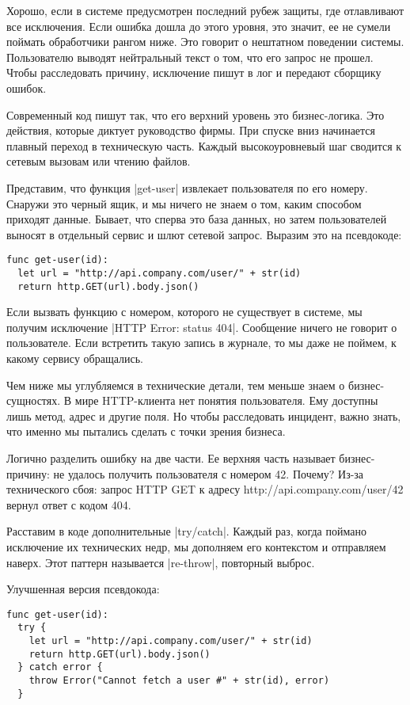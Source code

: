 Хорошо, если в системе предусмотрен последний рубеж защиты, где отлавливают все
исключения. Если ошибка дошла до этого уровня, это значит, ее не сумели поймать
обработчики рангом ниже. Это говорит о нештатном поведении системы. Пользователю
выводят нейтральный текст о том, что его запрос не прошел. Чтобы расследовать
причину, исключение пишут в лог и передают сборщику ошибок.

Современный код пишут так, что его верхний уровень это бизнес-логика. Это
действия, которые диктует руководство фирмы. При спуске вниз начинается плавный
переход в техническую часть. Каждый высокоуровневый шаг сводится к сетевым
вызовам или чтению файлов.

Представим, что функция \spverb|get-user| извлекает пользователя по его номеру. Снаружи
это черный ящик, и мы ничего не знаем о том, каким способом приходят
данные. Бывает, что сперва это база данных, но затем пользователей выносят в
отдельный сервис и шлют сетевой запрос. Выразим это на псевдокоде:

\begin{verbatim}
func get-user(id):
  let url = "http://api.company.com/user/" + str(id)
  return http.GET(url).body.json()
\end{verbatim}

Если вызвать функцию с номером, которого не существует в системе, мы получим
исключение \spverb|HTTP Error: status 404|. Сообщение ничего не говорит о
пользователе. Если встретить такую запись в журнале, то мы даже не поймем, к
какому сервису обращались.

Чем ниже мы углубляемся в технические детали, тем меньше знаем о
бизнес-сущностях. В мире HTTP-клиента нет понятия пользователя. Ему доступны
лишь метод, адрес и другие поля. Но чтобы расследовать инцидент, важно знать,
что именно мы пытались сделать с точки зрения бизнеса.

Логично разделить ошибку на две части. Ее верхняя часть называет бизнес-причину:
не удалось получить пользователя с номером 42. Почему? Из-за технического сбоя:
запрос HTTP GET к адресу http://api.company.com/user/42 вернул ответ с кодом
404.

Расставим в коде дополнительные \spverb|try/catch|. Каждый раз, когда поймано
исключение их технических недр, мы дополняем его контекстом и отправляем
наверх. Этот паттерн называется \spverb|re-throw|, повторный выброс.

Улучшенная версия псевдокода:

\begin{verbatim}
func get-user(id):
  try {
    let url = "http://api.company.com/user/" + str(id)
    return http.GET(url).body.json()
  } catch error {
    throw Error("Cannot fetch a user #" + str(id), error)
  }
\end{verbatim}

